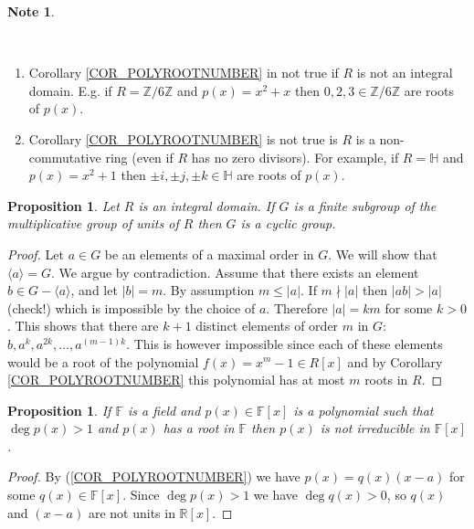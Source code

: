 \documentclass[12pt, letterpaper, oneside]{article}
\theoremstyle{plain}
\newtheorem{proposition}[theorem]{Proposition}
\theoremstyle{definition}
\newtheorem{note}[theorem]{Note}
\newcommand{\Z}{{\mathbb Z}}
\newcommand{\R}{{\mathbb R}}
\newcommand{\HH}{{\mathbb H}}
\newcommand{\F}{{\mathbb F}}
\newcommand{\subgp}[1]{\langle#1\rangle}
\newcommand{\benu}{\begin{enumerate}}
\newcommand{\eenu}{\end{enumerate}}
\newcommand{\vs}{\vskip 5mm}
\begin{document}
 
\vs\vs

\begin{note} \ 

\vskip -13mm 

\ 
\benu 
\item Corollary \ref{COR_POLYROOTNUMBER} in not true if $R$ is not an integral domain. 
E.g. if $R= \Z/6\Z$ and $p(x)= x^{2}+x$ then $0, 2, 3\in \Z/6\Z$ are roots of $p(x)$. 

\item  Corollary \ref{COR_POLYROOTNUMBER} is not true is $R$ is a non-commutative 
ring (even if $R$ has no zero divisors). For example, if $R = \HH$ and $p(x)= x^{2}+1$ then 
$\pm i, \pm j, \pm k\in \HH$ are roots of $p(x)$. 
\eenu


\end{note} 

\vs\vs


\begin{proposition} 
\label{PROP_FINMULTSUBGPDOMAIN}
Let $R$ is an integral domain. If $G$ is a finite subgroup of the 
multiplicative group of units of $R$ then $G$ is a cyclic group. 
\end{proposition}

\vs 

\begin{proof}
Let $a\in G$ be an elements of a maximal order in $G$. We will show that $\subgp{a} = G$. 
We argue by contradiction. Assume that there exists an element $b\in G -\subgp{a}$, and 
let $|b| = m$.  By assumption  $m \leq |a|$. If $m \nmid |a|$ then $|ab| > |a|$ (check!) which 
is impossible by the choice of $a$. Therefore   $|a| = km$ 
for some $k>0$.  This shows that there are  $k+1$ distinct elements of order $m$ in 
$G$: $b, a^{k}, a^{2k}, \dots, a^{(m-1)k}$.  This is however impossible since each of 
these elements would be a root of the polynomial $f(x) = x^{m} -1 \in R[x]$ and by 
Corollary \ref{COR_POLYROOTNUMBER} this polynomial has at most $m$ roots in $R$. 
\end{proof}


\vs\vs

\begin{proposition}
If $\F$ is a field and $p(x)\in \F[x]$ is a polynomial such that $\deg p(x) > 1$ and $p(x)$
has a root in  $\F$ then $p(x)$ is not irreducible in $\F[x]$. 
\end{proposition}
 
\vs 
 
\begin{proof}
By (\ref{COR_POLYROOTNUMBER}) we have $p(x) = q(x)(x-a)$ for some $q(x)\in \F[x]$. 
Since $\deg p(x) >1$ we have $\deg q(x) > 0$, so $q(x)$ and $(x-a)$ are not units in $\R[x]$.  
\end{proof} 
 
\end{document}
